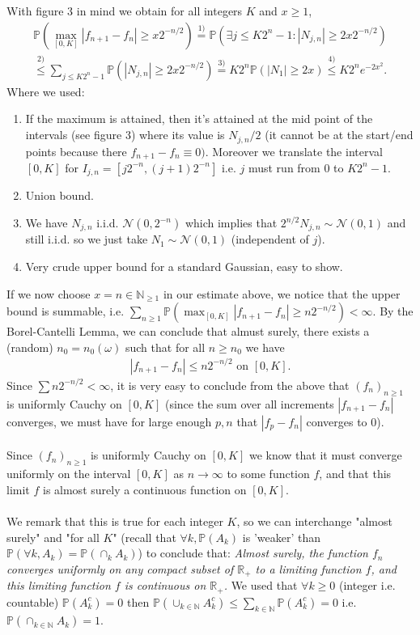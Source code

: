 \documentclass[../mainfile.tex]{subfiles}
\begin{document}
\newpage
With figure 3 in mind we obtain for all integers $K$ and $x \geq 1$,
\begin{align*}
\mathbb{P}( \max_{[0,K]} |f_{n+1}-f_n|  \geq x2^{-n/2} ) \overset{1)}= \mathbb{P}( \exists j \leq K2^n-1 : |N_{j,n}|  \geq 2x2^{-n/2} ) 
\\
\overset{2)}\leq \sum_{j \leq K2^n-1} \mathbb{P}(|N_{j,n}| \geq 2x2^{-n/2}) \overset{3)}= K2^n \mathbb{P}(|N_1| \geq 2x) \overset{4)}\leq K2^n e^{-2x^2}.
\end{align*}
Where we used:
\begin{enumerate}
\item If the maximum is attained, then it's attained at the mid point of the intervals (see figure 3) where its value is $N_{j,n}/2$ (it cannot be at the start/end points because there $f_{n+1}-f_n \equiv 0)$. Moreover we translate the interval $[0,K]$ for $I_{j,n}=[j2^{-n},(j+1)2^{-n}]$ i.e. $j$ must run from $0$ to $K2^n-1$. 
\item Union bound.
\item  We have $N_{j,n}$ i.i.d. $\mathcal{N}(0,2^{-n})$ which implies that $2^{n/2} N_{j,n} \sim \mathcal{N}(0,1)$ and still i.i.d. so we just take $N_1 \sim \mathcal{N}(0,1)$ (independent of $j$). 
\item Very crude upper bound for a standard Gaussian, easy to show. 
\end{enumerate}
If we now choose $x=n\in \mathbb{N}_{ \geq 1}$ in our estimate above, we  notice that the upper bound is summable, i.e. $\sum_{n \geq 1}\mathbb{P}( \max_{[0,K]} |f_{n+1}-f_n|  \geq n2^{-n/2} ) < \infty$. By the Borel-Cantelli Lemma, we can conclude that almust surely,  there exists a (random) $n_0=n_0(\omega)$ such that for all $n \geq n_0$ we have 
\begin{align*}
|f_{n+1}-f_n| \leq n2^{-n/2} \text{ on } [0,K].
\end{align*}
Since $\sum n2^{-n/2}< \infty$, it is very easy to conclude from the above that $(f_n)_{n \geq 1}$ is uniformly Cauchy on $[0,K]$ (since the sum over all increments $|f_{n+1}-f_n|$ converges, we must have for large enough $p,n$ that $|f_p-f_n|$ converges to $0$). \\
\\
Since $(f_n)_{n \geq 1}$ is uniformly Cauchy on $[0,K]$ we know that it must converge uniformly on the interval  $[0,K]$ as $n \to \infty$ to some function $f$, and that this limit $f$ is almost surely a continuous function on $[0,K]$. \\
\\
We remark that this is true for each integer $K$, so we can interchange "almost surely" and "for all $K$" (recall that $\forall k, \mathbb{P}(A_k)$ is 'weaker' than $\mathbb{P}(\forall k, A_k)= \mathbb{P}(\cap_k A_k)$) to conclude that: \textit{Almost surely, the function $f_n$ converges uniformly on any compact subset of $\mathbb{R}_+$ to a limiting function $f$, and this limiting function $f$ is continuous on $\mathbb{R}_+$.} We used that $\forall k \geq 0$ (integer i.e. countable) $\mathbb{P}(A_k^c)=0$ then $\mathbb{P}(\cup_{k \in \mathbb{N}} A_k^c) \leq \sum_{k \in \mathbb{N}} \mathbb{P}(A_k^c)=0$ i.e. $\mathbb{P}(\cap_{k \in \mathbb{N}} A_k)=1$. 
\newpage
\end{document}
